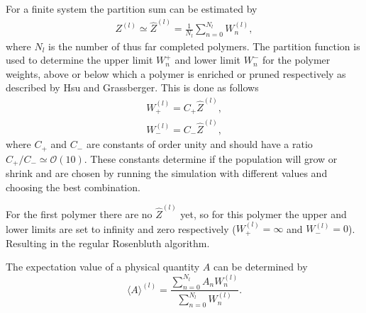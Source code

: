 For a finite system the partition sum can be estimated\cite{hsu2011review} by 
\begin{gather*}
    Z^{(l)} \simeq \hat{Z}^{(l)}
    = \frac{1}{N_l} \sum_{n=0}^{N_l}W_n^{(l)},
\end{gather*} where $N_l$ is the number of thus far completed polymers. The partition function is used to determine the upper limit $W_n^+$ and lower limit $W_n^-$ for the polymer weights, above or below which a polymer is enriched or pruned respectively as described by Hsu and Grassberger\cite{hsu2011review}. This is done as follows
\begin{gather*}
    W_+^{(l)} = C_+\hat{Z}^{(l)},\\
    W_-^{(l)} = C_-\hat{Z}^{(l)},
\end{gather*} where $C_+$ and $C_-$ are constants of order unity and should have a ratio $C_+/C_- \simeq \mathcal{O}(10)$. These constants determine if the population will grow or shrink and are chosen by running the simulation with different values and choosing the best combination.

For the first polymer there are no $\hat{Z}^{(l)}$ yet, so for this polymer the upper and lower limits are set to infinity and zero respectively ($ W_+^{(l)}= \infty$ and $W_-^{(l)}=0$). Resulting in the regular Rosenbluth algorithm.

The expectation value of a physical quantity $A$ can be determined by 
\begin{equation}
    \langle A \rangle^{(l)} = \frac{\sum_{n=0}^{N_l}A_nW_n^{(l)}}{\sum_{n=0}^{N_l}W_n^{(l)}}.
\end{equation}
